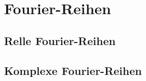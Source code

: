 %
%
%
\section{Fourier-Reihen
\label{section:fourier-reihen}}

\subsection{Relle Fourier-Reihen}

\subsection{Komplexe Fourier-Reihen}


